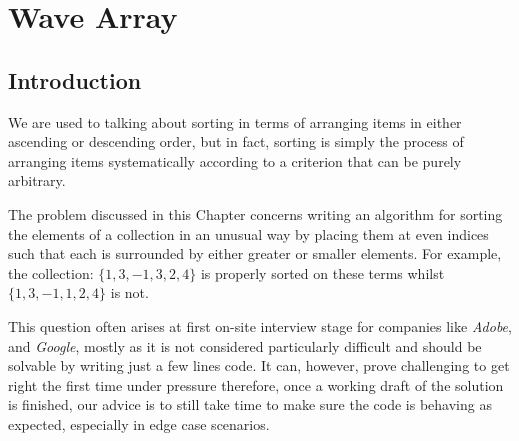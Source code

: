 %

\chapter{Wave Array}
\label{ch:wave_array}
\section*{Introduction}
We are used to talking about sorting in terms of arranging items in either ascending or descending order, but in fact, sorting is simply the process of arranging items systematically according to a criterion that can be purely arbitrary.

The problem discussed in this Chapter concerns writing an algorithm for sorting the elements of a collection in an unusual way by placing them at even indices such that each is surrounded by either greater or smaller elements. For example, the collection: $\{1,3,-1,3,2,4\}$ is properly sorted on these terms whilst $\{1,3,-1,1,2,4\}$ is not.

This question often arises at first on-site interview stage for companies like \textit{Adobe}, and \textit{Google}, mostly  as it is not considered particularly difficult and should be solvable by writing just a few lines code. It can, however, prove challenging to get right the first time under pressure therefore, once a working draft of the solution is finished, our advice is to still take time to make sure the code is behaving as expected, especially in edge case scenarios.

